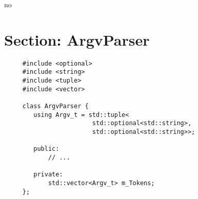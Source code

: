 no\section*{Section: ArgvParser}

\lstset{language=C++}
  \begin{lstlisting}
     #include <optional>
     #include <string>
     #include <tuple>
     #include <vector>
     
     class ArgvParser {
        using Argv_t = std::tuple<
                        std::optional<std::string>,
                        std::optional<std::string>>;
        
        public:
            // ...
        
        private:
            std::vector<Argv_t> m_Tokens;
     };
  \end{lstlisting}
  
  \newpage